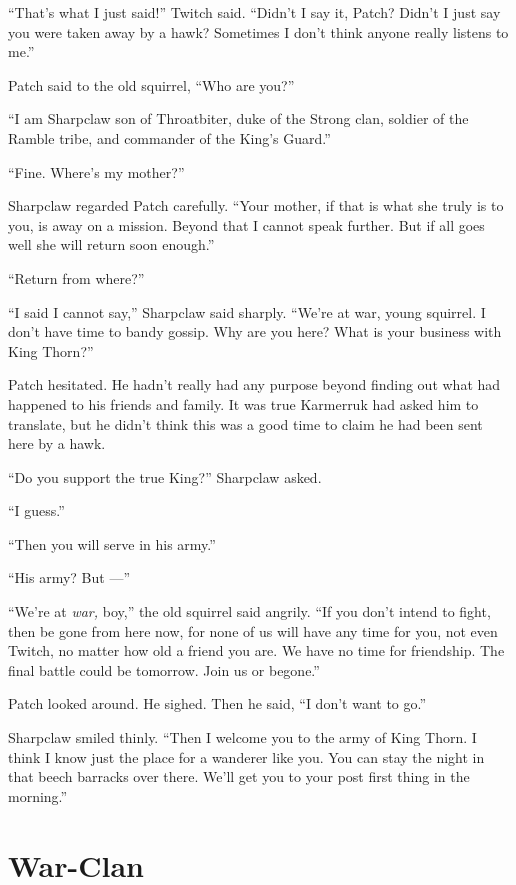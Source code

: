 \documentclass[ebook,oneside,openany,17pt]{memoir}
\newenvironment{tolerant}[1]{%
  \par\tolerance=#1\relax
}{%
  \par
}
\renewcommand{\thechapter}{\Roman{chapter}}
\newcounter{sections}
\newcommand{\sections}[1]{%
  \section*{#1}
  \addtocounter{sections}{1}%
  \pdfbookmark[1]{#1}{section.\thechapter.\thesections}}
\begin{document}
“That’s what I just said!” Twitch said. “Didn’t I say it, Patch?
Didn’t I just say you were taken away by a hawk? Sometimes I don’t
think anyone really listens to me.”

Patch said to the old squirrel, “Who are you?”

“I am Sharpclaw son of Throatbiter, duke of the Strong clan, soldier
of the Ramble tribe, and commander of the King’s Guard.”

“Fine. Where’s my mother?”

\begin{tolerant}{5000}
Sharpclaw regarded Patch carefully. “Your mother, if that is what she
truly is to you, is away on a mission. Beyond that I cannot speak
further. But if all goes well she will return soon enough.”
\end{tolerant}

“Return from where?”

\begin{tolerant}{1000}
“I said I cannot say,” Sharpclaw said sharply. “We’re at war, young
squirrel. I don’t have time to bandy gossip. Why are you here? What is
your business with King Thorn?”
\end{tolerant}

Patch hesitated. He hadn’t really had any purpose beyond finding out
what had happened to his friends and family. It was true Karmerruk had
asked him to translate, but he didn’t think this was a good time to
claim he had been sent here by a hawk.

“Do you support the true King?” Sharpclaw asked.

“I guess.”

“Then you will serve in his army.”

“His army? But —”

“We’re at \emph{war,} boy,” the old squirrel said angrily. “If you
don’t intend to fight, then be gone from here now, for none of us will
have any time for you, not even Twitch, no matter how old a friend you
are. We have no time for friendship. The final battle could be
tomorrow. Join us or begone.”

Patch looked around. He sighed. Then he said, “I don’t want to go.”

Sharpclaw smiled thinly. “Then I welcome you to the army of King
Thorn. I think I know just the place for a wanderer like you. You can
stay the night in that beech barracks over there. We’ll get you to
your post first thing in the morning.”


\sections{War-Clan}
\end{document}
